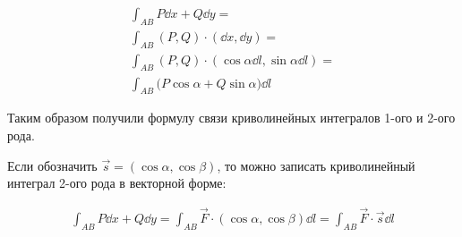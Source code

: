 
\begin{multicols}{2}
  \begin{align*}
    \int_{AB} P \dd x + Q \dd y = \\
    \int_{AB} (P, Q) \cdot (\dd x, \dd y) = \\
    \int_{AB} (P, Q) \cdot (\cos \alpha \dd l, \sin \alpha \dd l) = \\
    \int_{AB} \Big( P \cos \alpha + Q \sin \alpha \Big) \dd l
  \end{align*}
  \columnbreak

  
\end{multicols}

Таким образом получили формулу связи криволинейных интегралов 1-ого и 2-ого
рода.

\begin{remark}
  Если обозначить \(\vec{s} = (\cos \alpha, \cos \beta)\), то можно записать
  криволинейный интеграл 2-ого рода в векторной форме:

  \begin{align*}
    \int_{AB} P \dd x + Q \dd y
    = \int_{AB} \vec{F} \cdot (\cos \alpha, \cos \beta) \dd l
    = \int_{AB} \vec{F} \cdot \vec{s} \dd l
  \end{align*}
\end{remark}